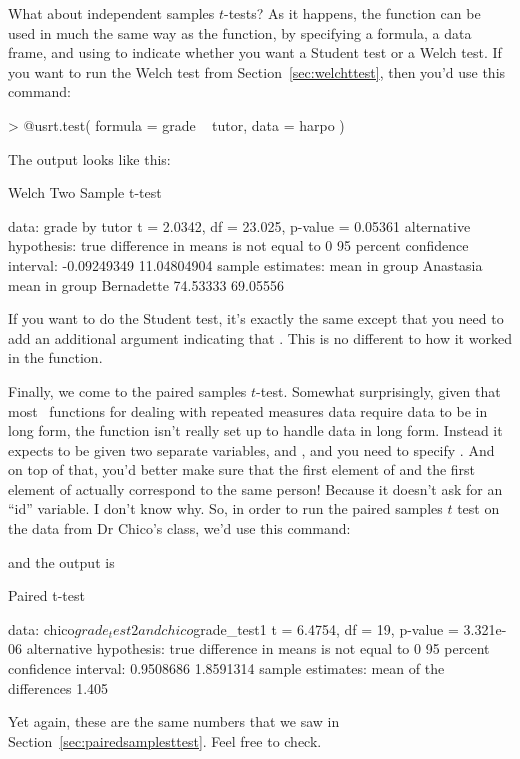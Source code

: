 What about independent samples $t$-tests? As it happens, the  function can be used in much the same way as the  function, by specifying a formula, a data frame, and using  to indicate whether you want a Student test or a Welch test. If you want to run the Welch test from Section~\ref{sec:welchttest}, then you'd use this command:
\begin{rblock1}
> @usr{t.test( formula = grade ~ tutor, data = harpo )}
\end{rblock1}
The output looks like this:
\begin{rblock1}
	Welch Two Sample t-test

data:  grade by tutor 
t = 2.0342, df = 23.025, p-value = 0.05361
alternative hypothesis: true difference in means is not equal to 0 
95 percent confidence interval:
 -0.09249349 11.04804904 
sample estimates:
 mean in group Anastasia mean in group Bernadette 
                74.53333                 69.05556 
\end{rblock1}
If you want to do the Student test, it's exactly the same except that you need to add an additional argument indicating that . This is no different to how it worked in the  function. 



Finally, we come to the paired samples $t$-test. Somewhat surprisingly, given that most \R\ functions for dealing with repeated measures data require data to be in long form, the  function isn't really set up to handle data in long form. Instead it expects to be given two separate variables,  and , and you need to specify . And on top of that, you'd better make sure that the first element of  and the first element of  actually correspond to the same person! Because it doesn't ask for an ``id'' variable. I don't know why. So, in order to run the paired samples $t$ test on the data from Dr Chico's class, we'd use this command:
and the output is
\begin{rblock1}
	Paired t-test

data:  chico$grade_test2 and chico$grade_test1
t = 6.4754, df = 19, p-value = 3.321e-06
alternative hypothesis: true difference in means is not equal to 0
95 percent confidence interval:
 0.9508686 1.8591314
sample estimates:
mean of the differences 
                  1.405 

\end{rblock1}
Yet again, these are the same numbers that we saw in Section~\ref{sec:pairedsamplesttest}. Feel free to check. 



